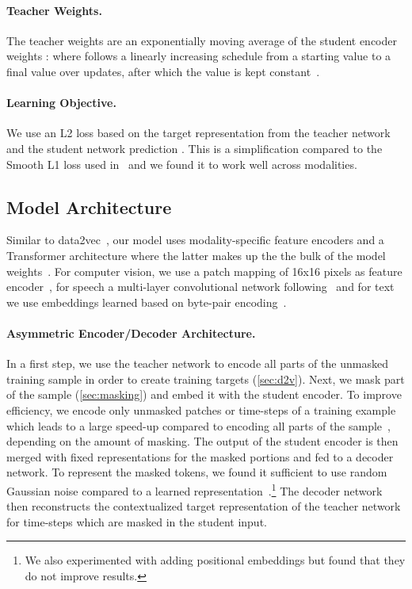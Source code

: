\documentclass[nohyperref]{article}
\theoremstyle{plain}
\theoremstyle{definition}
\theoremstyle{remark}
\begin{document}
\paragraph{Teacher Weights.}
The teacher weights  are an exponentially moving average of the student encoder weights  \citep{grill2020byol}:  where  follows a linearly increasing schedule from a starting value  to a final value  over  updates, after which the value is kept constant~\citep{baevski2022d2v}.

\paragraph{Learning Objective.}
We use an L2 loss based on the target representation from the teacher network  and the student network prediction .
This is a simplification compared to the Smooth L1 loss used in~\citet{baevski2022d2v} and we found it to work well across modalities.




\subsection{Model Architecture}
\label{sec:architecture}

Similar to data2vec~\citep{baevski2022d2v}, our model uses modality-specific feature encoders and a Transformer architecture where the latter makes up the the bulk of the model weights~\citep{vaswani2017transformer}.
For computer vision, we use a patch mapping of 16x16 pixels as feature encoder~\citep{dosovitskiy2020vit}, for speech a multi-layer convolutional network following~\citet{oord2018cpc,baevski2020wav,baevski2022d2v} and for text we use embeddings learned based on byte-pair encoding~\citep{sennrich2016bpe}.


\paragraph{Asymmetric Encoder/Decoder Architecture.}
In a first step, we use the teacher network to encode all parts of the unmasked training sample in order to create training targets (\textsection\ref{sec:d2v}).
Next, we mask part of the sample (\textsection\ref{sec:masking}) and embed it with the student encoder. 
To improve efficiency, we encode only unmasked patches or time-steps of a training example which leads to a large speed-up compared to encoding all parts of the sample~\citep{he2021mae}, depending on the amount of masking.
The output of the student encoder is then merged with fixed representations for the masked portions and fed to a decoder network.
To represent the masked tokens, we found it sufficient to use random Gaussian noise compared to a learned representation~\citep{he2021mae}.\footnote{We also experimented with adding positional embeddings but found that they do not improve results.}
The decoder network then reconstructs the contextualized target representation of the teacher network for time-steps which are masked in the student input.
\end{document}
